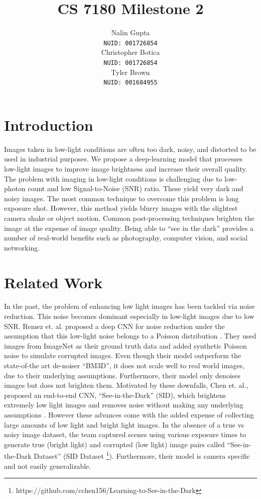 \documentclass{article}
\title{CS 7180 Milestone 2}
\author{%
  Nalin Gupta \\
  \texttt{NUID: 001726854} \\
  \And
  Christopher Botica\\
  \texttt{NUID: 001726854} \\
  \And
  Tyler Brown\\
  \texttt{NUID: 001684955} \\
}
\begin{document}

\maketitle

\section{Introduction}

Images taken in low-light conditions are often too dark, noisy, and
distorted to be used in industrial purposes. We propose a deep-learning
model that processes low-light images to improve image brightness and
increase their overall quality. The problem with imaging in low-light
conditions is challenging due to low-photon count and low
Signal-to-Noise (SNR) ratio. These yield very dark and noisy images. The
most common technique to overcome this problem is long exposure shot.
However, this method yields blurry images with the slightest camera shake
or object motion\cite{chen2018learning}. Common post-processing
techniques brighten the image at the expense of image quality. Being able to
``see in the dark'' provides a number of real-world benefits such as
photography, computer vision, and social networking.

\section{Related Work}

In the past, the problem of enhancing low light images has been tackled via
noise reduction. This noise becomes dominant especially in low-light images
due to low SNR. Remez et. al. proposed a deep CNN for noise reduction under
the assumption that this low-light noise belongs to a Poisson
distribution \cite{remez2017deep}.  They used images from ImageNet
\cite{imagenet_cvpr09} as their ground truth data
and added synthetic Poisson noise to simulate corrupted images. Even though
their model outperform the state-of-the art de-noiser ``BM3D'', it does not
scale well to real world images, due to their underlying assumptions.
Furthermore, their model only denoises images but does not brighten them.
Motivated by these downfalls, Chen et. al., proposed an end-to-end CNN,
``See-in-the-Dark'' (SID), which brightens extremely low light images and
removes noise without making any underlying assumptions
\cite{chen2018learning}. However these advances come with the added expense
of collecting large amounts of low
light and bright light images. In the absence of a true vs noisy image
dataset, the team captured scenes using various exposure times to generate
true (bright light) and corrupted (low light) image pairs called
``See-in-the-Dark Dataset'' (SID Dataset
\footnote{https://github.com/cchen156/Learning-to-See-in-the-Dark}). Furthermore,
their model is camera specific and not easily generalizable.\newline
\end{document}
